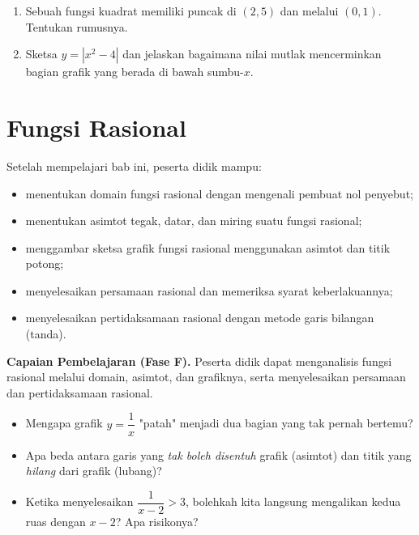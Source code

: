 \documentclass[11pt,a4paper]{report}
\theoremstyle{gaya}
\begin{document}
\begin{challenge}
\begin{enumerate}[leftmargin=*,topsep=2pt]
  \item Sebuah fungsi kuadrat memiliki puncak di $(2,5)$ dan melalui $(0,1)$. Tentukan rumusnya.
  \item Sketsa $y=|x^2-4|$ dan jelaskan bagaimana nilai mutlak mencerminkan bagian grafik yang berada di bawah sumbu-$x$.
\end{enumerate}
\end{challenge}

\chapter{Fungsi Rasional}
\begin{tujuan}
Setelah mempelajari bab ini, peserta didik mampu:
\begin{itemize}[leftmargin=*,topsep=2pt]
  \item menentukan domain fungsi rasional dengan mengenali pembuat nol penyebut;
  \item menentukan asimtot tegak, datar, dan miring suatu fungsi rasional;
  \item menggambar sketsa grafik fungsi rasional menggunakan asimtot dan titik potong;
  \item menyelesaikan persamaan rasional dan memeriksa syarat keberlakuannya;
  \item menyelesaikan pertidaksamaan rasional dengan metode garis bilangan (tanda).
\end{itemize}
\textbf{Capaian Pembelajaran (Fase F).} Peserta didik dapat menganalisis fungsi rasional melalui domain, asimtot, dan grafiknya, serta menyelesaikan persamaan dan pertidaksamaan rasional.
\end{tujuan}

\begin{pemantik}
\begin{itemize}[leftmargin=*,topsep=2pt]
  \item Mengapa grafik $y=\dfrac{1}{x}$ "patah" menjadi dua bagian yang tak pernah bertemu?
  \item Apa beda antara garis yang \emph{tak boleh disentuh} grafik (asimtot) dan titik yang \emph{hilang} dari grafik (lubang)?
  \item Ketika menyelesaikan $\dfrac{1}{x-2}>3$, bolehkah kita langsung mengalikan kedua ruas dengan $x-2$? Apa risikonya?
\end{itemize}
\end{pemantik}
\end{document}
